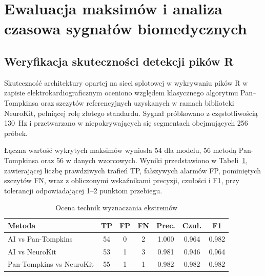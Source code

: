 \documentclass[journal]{IEEEtran}
\begin{document}
{\newpage
\section{Ewaluacja maksimów i analiza czasowa sygnałów biomedycznych}
\subsection{Weryfikacja skuteczności detekcji pików R}
Skuteczność architektury opartej na sieci splotowej w wykrywaniu pików R w zapisie elektrokardiograficznym oceniono względem klasycznego algorytmu Pan–Tompkinsa oraz szczytów referencyjnych uzyskanych w ramach biblioteki NeuroKit, pełniącej rolę złotego standardu. Sygnał próbkowano z częstotliwością 130 Hz i przetwarzano w niepokrywających się segmentach obejmujących 256 próbek. 

Łączna wartość wykrytych maksimów wyniosła 54 dla modelu, 56 metodą Pan-Tompkinsa oraz 56 w danych wzorcowych. Wyniki przedstawiono w Tabeli~\ref{tab:peak_comparison}, zawierającej liczbę prawdziwych trafień TP, fałszywych alarmów FP, pominiętych szczytów FN, wraz z obliczonymi wskaźnikami precyzji, czułości i F1, przy tolerancji odpowiadającej 1–2 punktom przebiegu.

\begin{table}[ht]
\caption{Ocena technik wyznaczania ekstremów}
\label{tab:peak_comparison}
\centering
\begin{tabular}{|p{3.08cm}|c|c|c|c|c|c|}
\hline
\textbf{Metoda} & \textbf{TP} & \textbf{FP} & \textbf{FN} & \textbf{Prec.} & \textbf{Czuł.} & \textbf{F1} \\
\hline
AI vs Pan-Tompkins & 54 & 0 & 2 & 1.000 & 0.964 & 0.982 \\
AI vs NeuroKit & 53 & 1 & 3 & 0.981 & 0.946 & 0.964 \\
Pan-Tompkins vs NeuroKit & 55 & 1 & 1 & 0.982 & 0.982 & 0.982 \\
\hline
\end{tabular}
\end{table}

}
\end{document}
